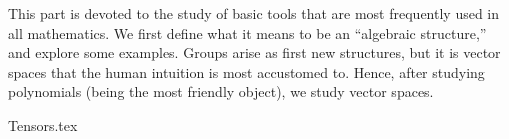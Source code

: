 \label{part:basicalgebra}

This part is devoted to the study of basic tools
that are most frequently used in all mathematics.
We first define what it means to be an ``algebraic structure,''
and explore some examples.
Groups arise as first new structures,
but it is vector spaces that the human intuition is most accustomed to.
Hence, after studying polynomials (being the most friendly object),
we study vector spaces.

{Tensors.tex}